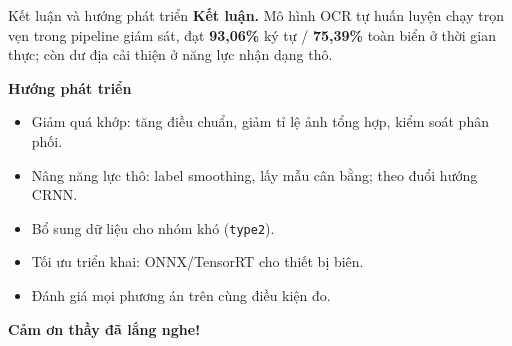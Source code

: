 \documentclass[aspectratio=169,9pt]{beamer}
\begin{document}
\begin{frame}{Kết luận và hướng phát triển}
\textbf{Kết luận.} Mô hình OCR tự huấn luyện chạy trọn vẹn trong pipeline giám sát, đạt \textbf{93,06\%} ký tự / \textbf{75,39\%} toàn biển ở thời gian thực; còn dư địa cải thiện ở năng lực nhận dạng thô.
\medskip

\textbf{Hướng phát triển}
\begin{itemize}\footnotesize
  \item Giảm quá khớp: tăng điều chuẩn, giảm tỉ lệ ảnh tổng hợp, kiểm soát phân phối.
  \item Nâng năng lực thô: label smoothing, lấy mẫu cân bằng; theo đuổi hướng CRNN.
  \item Bổ sung dữ liệu cho nhóm khó (\texttt{type2}).
  \item Tối ưu triển khai: ONNX/TensorRT cho thiết bị biên.
  \item Đánh giá mọi phương án trên cùng điều kiện đo.
\end{itemize}
\end{frame}

\begin{frame}[plain]
\centering\vfill
{\Huge\textbf{Cảm ơn thầy đã lắng nghe!}}
\vfill
\end{frame}
\end{document}
